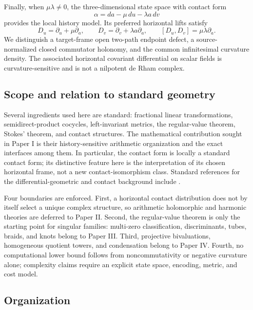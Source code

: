 Finally, when \(\mu\lambda\ne0\), the three-dimensional state space with contact form
\[
 \alpha=da-\mu\,du-\lambda a\,dv
\]
provides the local history model.  Its preferred horizontal lifts satisfy
\[
 D_u=\partial_u+\mu\partial_a,
 \qquad
 D_v=\partial_v+\lambda a\partial_a,
 \qquad
 [D_u,D_v]=\mu\lambda\partial_a.
\]
We distinguish a target-frame open two-path endpoint defect, a source-normalized
closed commutator holonomy, and the common infinitesimal curvature density.  The associated horizontal
covariant differential on scalar fields is curvature-sensitive and is not a
nilpotent de Rham complex.

\subsection{Scope and relation to standard geometry}

Several ingredients used here are standard: fractional linear transformations,
semidirect-product cocycles, left-invariant metrics, the regular-value theorem,
Stokes' theorem, and contact structures.  The mathematical contribution sought in
Paper I is their history-sensitive arithmetic organization and the exact interfaces
among them.  In particular, the contact form is locally a standard contact form; its
distinctive feature here is the interpretation of its chosen horizontal frame, not a
new contact-isomorphism class.  Standard references for the differential-geometric
and contact background include \cite{KobayashiNomizu1963FDG1,Geiges2008IntroContact}.

Four boundaries are enforced.  First, a horizontal contact distribution does not by
itself select a unique complex structure, so arithmetic holomorphic and harmonic
theories are deferred to Paper II.  Second, the regular-value theorem is only the
starting point for singular families: multi-zero classification, discriminants,
tubes, braids, and knots belong to Paper III.  Third, projective bivaluations,
homogeneous quotient towers, and condensation belong to Paper IV.  Fourth, no
computational lower bound follows from noncommutativity or negative curvature alone;
complexity claims require an explicit state space, encoding, metric, and cost model.

\subsection{Organization}

